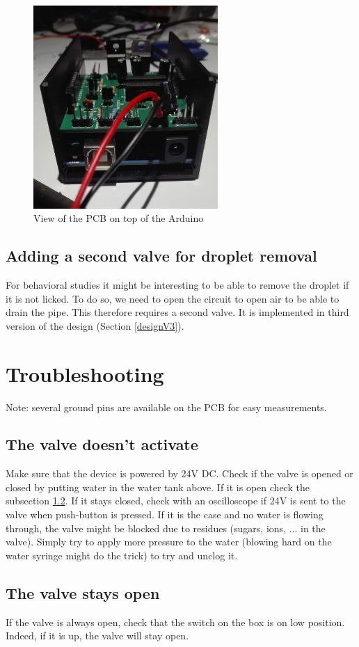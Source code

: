 \documentclass[a4paper]{article}
\begin{document}
\begin{figure}[h!]
    \centering
    \includegraphics[width=7cm]{images/enclosure.jpg}
    \caption{View of the PCB on top of the Arduino}
    \label{fig:my_label}
\end{figure}

\subsection{Adding a second valve for droplet removal}
For behavioral studies it might be interesting to be able to remove the droplet if it is not licked. To do so, we need to open the circuit to open air to be able to drain the pipe. This therefore requires a second valve.
It is implemented in third version of the design (Section \ref{designV3}).


\section{Troubleshooting}
Note: several ground pins are available on the PCB for easy measurements.
\subsection{The valve doesn't activate}
Make sure that the device is powered by 24V DC.
Check if the valve is opened or closed by putting water in the water tank above.
If it is open check the subsection \ref{staysOpen}.
If it stays closed, check with an oscilloscope if 24V is sent to the valve when push-button is pressed. If it is the case and no water is flowing through, the valve might be blocked due to residues (sugars, ions, ... in the valve). Simply try to apply more pressure to the water (blowing hard on the water syringe might do the trick) to try and unclog it.
\subsection{The valve stays open}
\label{staysOpen}
If the valve is always open, check that the switch on the box is on low position. Indeed, if it is up, the valve will stay open.
\end{document}
